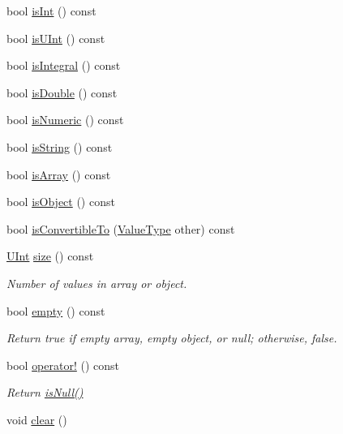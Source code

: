 \begin{DoxyCompactItemize}
bool \hyperlink{classJson_1_1Value_ab0df4746d6787d2ce1db1a156c118f14}{is\-Int} () const 
\item 
bool \hyperlink{classJson_1_1Value_ae814ca1796fe2d43ac09898b70213989}{is\-U\-Int} () const 
\item 
bool \hyperlink{classJson_1_1Value_aec4f74ef7b776b1d9c8a10fc3bb4add5}{is\-Integral} () const 
\item 
bool \hyperlink{classJson_1_1Value_a0ea567fa51fc808851698bef59b43626}{is\-Double} () const 
\item 
bool \hyperlink{classJson_1_1Value_a8ce848900e2e8fa23a41fcc2c1409fab}{is\-Numeric} () const 
\item 
bool \hyperlink{classJson_1_1Value_a06c01d7c1e8151a5844b595ab00f46c7}{is\-String} () const 
\item 
bool \hyperlink{classJson_1_1Value_ac8c898f93543e55b67418f94bced20af}{is\-Array} () const 
\item 
bool \hyperlink{classJson_1_1Value_a80cffaa0402b80317c0437216bbb6d92}{is\-Object} () const 
\item 
bool \hyperlink{classJson_1_1Value_a7ec153803631a27abf58cba2bb1af70c}{is\-Convertible\-To} (\hyperlink{namespaceJson_a7d654b75c16a57007925868e38212b4e}{Value\-Type} other) const 
\item 
\hyperlink{classJson_1_1Value_a0933d59b45793ae4aade1757c322a98d}{U\-Int} \hyperlink{classJson_1_1Value_a69d4f979237e19aabef12de56c18c38f}{size} () const 
\begin{DoxyCompactList}\small\item\em Number of values in array or object. \end{DoxyCompactList}\item 
bool \hyperlink{classJson_1_1Value_a99c42d3ff8495dad1e91b43e66553c36}{empty} () const 
\begin{DoxyCompactList}\small\item\em Return true if empty array, empty object, or null; otherwise, false. \end{DoxyCompactList}\item 
bool \hyperlink{classJson_1_1Value_a021ab0d15a807fbe051446c9c545ab61}{operator!} () const 
\begin{DoxyCompactList}\small\item\em Return \hyperlink{classJson_1_1Value_aeb9ad8b1bb91bdd72203dc884b3f4362}{is\-Null()} \end{DoxyCompactList}\item 
void \hyperlink{classJson_1_1Value_a501a4d67e6c875255c2ecc03ccd2019b}{clear} ()

\end{DoxyCompactItemize}
